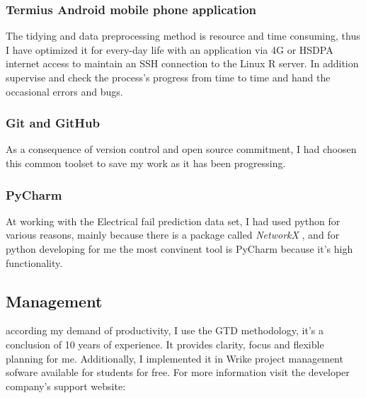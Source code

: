 			\subsubsection{Termius Android mobile phone application}
The tidying and data preprocessing method is resource and time consuming, thus I have optimized it for every-day life with an application via 4G or HSDPA internet access to maintain an SSH connection to the Linux R server. In addition supervise and check the process's progress from time to time and hand the occasional errors and bugs.
\cite{Termius}
			\subsubsection{Git and GitHub}
As a consequence of version control and open source commitment, I had choosen this common toolset to save my work as it has been progressing.
\cite{Github}
			\subsubsection{PyCharm}
At working with the Electrical fail prediction data set, I had used python for various reasons, mainly because there is a package called \textit{NetworkX} \cite{NetworkX}, and for python developing for me the most convinent tool is PyCharm because it's high functionality.
\cite{PyCharm}	
		\subsection{Management}
according my demand of productivity, I use the GTD\cite{GTD} methodology, it's a conclusion of 10 years of experience. It provides clarity, focus and flexible planning for me. Additionally, I implemented it in Wrike \cite{WRIKE} project management sofware available for students for free. For more information visit the developer company's support website: \cite{WRIKE_for_students}
